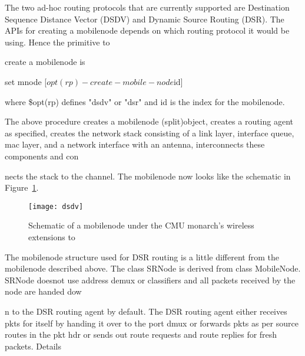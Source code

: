 The two ad-hoc routing protocols that are currently supported are Destination Sequence Distance Vector (DSDV) and Dynamic Source Routing (DSR). The APIs for creating a mobilenode depends on which routing protocol it would be using. Hence the primitive to 









create a mobilenode is

\begin{program}
	set mnode [$opt(rp)-create-mobile-node $id] 
\end{program}
where \$opt(rp) defines "dsdv" or "dsr" and id is the index for the mobilenode.

The above procedure creates a mobilenode (split)object, creates a routing agent as specified, creates the network stack consisting of a link layer, interface queue, mac layer, and a network interface with an antenna, interconnects these components and con









nects the stack to the channel. The mobilenode now looks like the schematic in Figure~\ref{fig:mobilenode-dsdv}. 
\begin{figure}
    \centerline{\texttt{[image: dsdv]}}
    \caption{Schematic of a mobilenode under the CMU monarch's wireless extensions to \ns}
    \label{fig:mobilenode-dsdv}
\end{figure}

The mobilenode structure used for DSR routing is a little different from the mobilenode described above. The class SRNode is derived from class MobileNode. SRNode doesnot use address demux or classifiers and all packets received by the node are handed dow









n to the DSR routing agent by default. The DSR routing agent either receives pkts for itself by handing it over to the port dmux or forwards pkts as per source routes in the pkt hdr or sends out route requests and route replies for fresh packets. Details 









